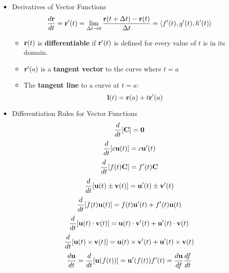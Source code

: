 \begin{itemize}
  \item Derivatives of Vector Functions
      \[\displaystyle \frac{d\mathbf{r}}{dt} = \mathbf{r}'(t) = \lim_{\Delta t \to 0} \frac{\mathbf{r}(t+\Delta t) - \mathbf{r}(t)}{\Delta t} = \left<f'(t),g'(t),h'(t)\right>\]
    \begin{itemize}
      \item $\mathbf{r}(t)$ is \textbf{differentiable} if $\mathbf{r}'(t)$ is defined for every value of $t$ is in its domain.
      \item $\mathbf{r}'(a)$ is a \textbf{tangent vector} to the curve where $t=a$
      \item The \textbf{tangent line} to a curve at $t=a$: \[\mathbf{l}(t)=\mathbf{r}(a)+t\mathbf{r}'(a)\]
    \end{itemize}

  
  \item Differentiation Rules for Vector Functions
      \[\frac{d}{dt} [\mathbf{C}] = \mathbf{0}\]
      \[\frac{d}{dt} [c\mathbf{u}(t)] = c\mathbf{u}'(t)\]
      \[\frac{d}{dt} [f(t)\mathbf{C}] = f'(t)\mathbf{C}\]
      \[\frac{d}{dt} [\mathbf{u}(t) \pm \mathbf{v}(t)] = \mathbf{u}'(t) \pm \mathbf{v}'(t)\]
      \[\frac{d}{dt} [f(t)\mathbf{u}(t)] = f(t)\mathbf{u}'(t) + f'(t)\mathbf{u}(t)\]
      \[\frac{d}{dt} [\mathbf{u}(t) \cdot \mathbf{v}(t)] = \mathbf{u}(t)\cdot\mathbf{v}'(t) + \mathbf{u}'(t)\cdot\mathbf{v}(t)\]
      \[\frac{d}{dt} [\mathbf{u}(t) \times \mathbf{v}(t)] = \mathbf{u}(t)\times\mathbf{v}'(t) + \mathbf{u}'(t)\times\mathbf{v}(t)\]
      \[\frac{d\mathbf{u}}{dt} = \frac{d}{dt} [\mathbf{u}(f(t))] =\mathbf{u}'(f(t))f'(t) = \frac{d\mathbf{u}}{df}\frac{df}{dt}\]
  

\end{itemize}
